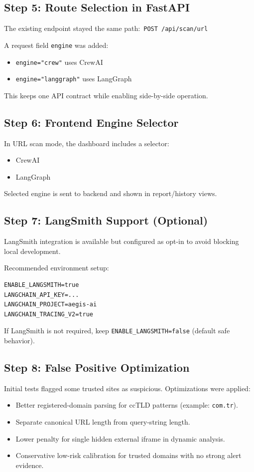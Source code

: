 \documentclass[11pt,a4paper]{article}
\begin{document}
\subsection{Step 5: Route Selection in FastAPI}
The existing endpoint stayed the same path:\
\texttt{POST /api/scan/url}

A request field \texttt{engine} was added:
\begin{itemize}[leftmargin=1.25em]
  \item \texttt{engine="crew"} uses CrewAI
  \item \texttt{engine="langgraph"} uses LangGraph
\end{itemize}

This keeps one API contract while enabling side-by-side operation.

\subsection{Step 6: Frontend Engine Selector}
In URL scan mode, the dashboard includes a selector:
\begin{itemize}[leftmargin=1.25em]
  \item CrewAI
  \item LangGraph
\end{itemize}

Selected engine is sent to backend and shown in report/history views.

\subsection{Step 7: LangSmith Support (Optional)}
LangSmith integration is available but configured as opt-in to avoid blocking local development.

Recommended environment setup:
\begin{lstlisting}[style=code]
ENABLE_LANGSMITH=true
LANGCHAIN_API_KEY=...
LANGCHAIN_PROJECT=aegis-ai
LANGCHAIN_TRACING_V2=true
\end{lstlisting}

If LangSmith is not required, keep \texttt{ENABLE\_LANGSMITH=false} (default safe behavior).

\subsection{Step 8: False Positive Optimization}
Initial tests flagged some trusted sites as suspicious. Optimizations were applied:
\begin{itemize}[leftmargin=1.25em]
  \item Better registered-domain parsing for ccTLD patterns (example: \texttt{com.tr}).
  \item Separate canonical URL length from query-string length.
  \item Lower penalty for single hidden external iframe in dynamic analysis.
  \item Conservative low-risk calibration for trusted domains with no strong alert evidence.
\end{itemize}
\end{document}
